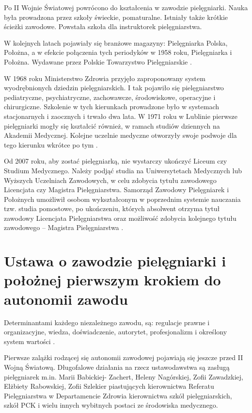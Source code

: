 \documentclass[a4paper,12pt,twoside,openright]{mwrep}
\begin{document}
Po II Wojnie Światowej powrócono do kształcenia w zawodzie pielęgniarki. Nauka była prowadzona przez szkoły świeckie, pomaturalne. Istniały także krótkie ścieżki zawodowe. Powstała szkoła dla instruktorek pielęgniarstwa.

W kolejnych latach pojawiały się branżowe magazyny: Pielęgniarka Polska, Położna, a w efekcie połączenia tych periodyków w 1958 roku, Pielęgniarka i Położna. Wydawane przez Polskie Towarzystwo Pielęgniarskie \cite{czas}.

W 1968 roku Ministerstwo Zdrowia przyjęło zaproponowany system wyodrębnionych dziedzin pielęgniarskich. I tak pojawiło się pielęgniarstwo pediatryczne, psychiatryczne, zachowawcze, środowiskowe, operacyjne i chirurgiczne. Szkolenie w tych kierunkach prowadzone było w systemach stacjonarnych i zaocznych i trwało dwa lata. W 1971 roku w Lublinie pierwsze pielęgniarki mogły się kształcić również, w ramach studiów dziennych na Akademii Medycznej. Kolejne uczelnie medyczne otworzyły swoje podwoje dla tego kierunku wkrótce po tym \cite{spec}.
 
Od 2007 roku, aby zostać pielęgniarką, nie wystarczy ukończyć Liceum czy Studium Medycznego. Należy podjąć studia na Uniwersytetach Medycznych lub Wyższych Uczelniach Zawodowych, w celu zdobycia tytułu zawodowego Licencjata czy Magistra Pielęgniarstwa. Samorząd Zawodowy Pielęgniarek i Położnych umożliwił osobom wykształconym w poprzednim systemie nauczania tzw. studia pomostowe, po ukończeniu, których absolwent otrzyma tytuł zawodowy Licencjata Pielęgniarstwa oraz możliwość zdobycia kolejnego tytułu zawodowego – Magistra Pielęgniarstwa \cite{model}.

\section{Ustawa o zawodzie pielęgniarki i położnej pierwszym krokiem do autonomii zawodu}
Determinantami każdego niezależnego zawodu, są: regulacje prawne i organizacyjne, wiedza, doświadczenie, autorytet, profesjonalizm i określony system wartości \cite{deter}.

Pierwsze zalążki rodzącej się autonomii zawodowej pojawiają się jeszcze przed II Wojną Światową. Długofalowe działania na rzecz ustawodawstwa są zasługą pielęgniarek m.in.  Marii Babickiej- Zachert, Heleny Nagórskiej, Zofii Zawadzkiej, Elżbiety Rabowskiej, Zofii Szlekier piastujących kierownictwa Referatu Pielęgniarstwa w Departamencie Zdrowia kierownictwa szkół pielęgniarskich, szkół PCK i wielu innych wybitnych postaci ze środowiska medycznego.
\end{document}
